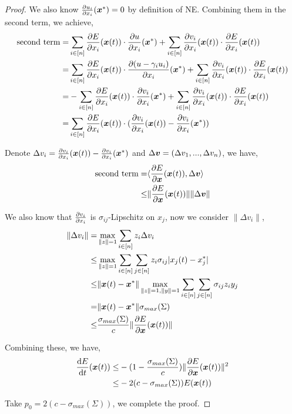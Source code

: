 \begin{proof}


We also know $\frac{\partial u_i}{\partial x_i}({\bm{x}}^*) = 0$ by definition of NE.
Combining them in the second term, we achieve,
\begin{align*}
    \text{second term} =& \sum_{i\in[n]} \frac{\partial E}{\partial x_i}({\bm{x}}(t))\cdot \frac{\partial u}{\partial x_i}({\bm{x}}^*)
    + \sum_{i\in[n]} \frac{\partial v_i}{\partial x_i}({\bm{x}}(t)) \cdot \frac{\partial E}{\partial x_i}({\bm{x}}(t))
    \\
    =& \sum_{i\in[n]} \frac{\partial E}{\partial x_i}({\bm{x}}(t))\cdot \frac{\partial (u - \gamma_i u_i)}{\partial x_i}({\bm{x}}^*)
    + \sum_{i\in[n]} \frac{\partial v_i}{\partial x_i}({\bm{x}}(t)) \cdot \frac{\partial E}{\partial x_i}({\bm{x}}(t))
    \\
    =& - \sum_{i\in[n]} \frac{\partial E}{\partial x_i}({\bm{x}}(t))\cdot \frac{\partial v_i}{\partial x_i}({\bm{x}}^*)
    + \sum_{i\in[n]} \frac{\partial v_i}{\partial x_i}({\bm{x}}(t)) \cdot \frac{\partial E}{\partial x_i}({\bm{x}}(t))
    \\
    =& \sum_{i\in[n]} \frac{\partial E}{\partial x_i}({\bm{x}}(t))\cdot (\frac{\partial v_i}{\partial x_i}({\bm{x}}(t)) - \frac{\partial v_i}{\partial x_i}({\bm{x}}^*))
    \\
\end{align*}

Denote $\Delta v_i = \frac{\partial v_i}{\partial x_i}({\bm{x}}(t)) - \frac{\partial v_i}{\partial x_i}({\bm{x}}^*)$ and $\Delta {\bm{v}} = (\Delta v_1,...,\Delta v_n)$, we have,
\begin{align*}
    \text{second term} =& \langle \frac{\partial E}{\partial {\bm{x}}}({\bm{x}}(t)), \Delta {\bm{v}} \rangle
    \\
    \le & \|\frac{\partial E}{\partial {\bm{x}}}({\bm{x}}(t))\| \|\Delta {\bm{v}}\|
\end{align*}

We also know that $\frac{\partial v_i}{\partial x_i}$ is $\sigma_{ij}$-Lipschitz on $x_j$, now we consider $\| \Delta v_i\|$,
\begin{align*}
    \|\Delta v_i \| =& \max_{\|z \|=1} \sum_{i\in[n]} z_i \Delta v_i
    \\
    \le& \max_{\|z \|=1} \sum_{i\in[n]}\sum_{j\in[n]} z_i \sigma_{ij} |x_j(t) - x_j^*|
    \\
    \le& \| {\bm{x}}(t) - {\bm{x}}^* \| \max_{\|z \|=1, \| y\| =1} \sum_{i\in[n]}\sum_{j\in[n]} \sigma_{ij} z_i y_j
    \\
    =& \| {\bm{x}}(t) - {\bm{x}}^* \| \sigma_{max}(\Sigma)
    \\
    \le& \frac{\sigma_{max}(\Sigma)}{c} \| \frac{\partial E}{\partial {\bm{x}}}({\bm{x}}(t))\|
\end{align*}

Combining these, we have,
\begin{align*}
    \frac{\mathrm{d} E}{\mathrm{d} t}({\bm{x}}(t)) \le& -(1-\frac{\sigma_{max}(\Sigma)}{c}) \| \frac{\partial E}{\partial {\bm{x}}}({\bm{x}}(t))\|^2
    \\
    \le& -2(c - \sigma_{max}(\Sigma)) E({\bm{x}}(t))
\end{align*}

Take $p_0 = 2(c - \sigma_{max}(\Sigma))$, we complete the proof.


\end{proof}